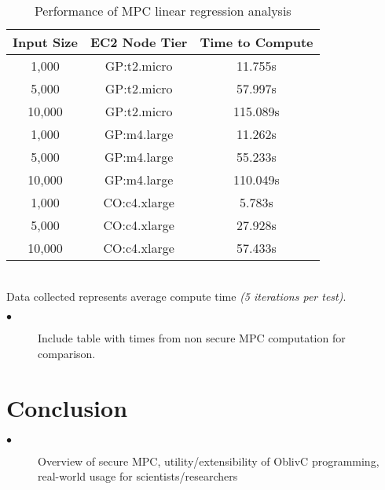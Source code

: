\documentclass{article}
\begin{document}
\begin{table}[htb]
\caption{Performance of MPC linear regression analysis}
\centering

\begin{tabular}{| c | c | c |}
\hline Input Size & EC2 Node Tier & Time to Compute\\
\hline 1,000 & GP:t2.micro & 11.755s\\
\hline 5,000 & GP:t2.micro & 57.997s\\
\hline 10,000 & GP:t2.micro & 115.089s\\ 
\hline 1,000 & GP:m4.large & 11.262s\\ 
\hline 5,000 & GP:m4.large & 55.233s\\ 
\hline 10,000 & GP:m4.large & 110.049s\\
\hline 1,000 & CO:c4.xlarge & 5.783s\\
\hline 5,000 & CO:c4.xlarge & 27.928s\\
\hline 10,000 & CO:c4.xlarge & 57.433s\\
\hline
\end{tabular}
\end{table}
\\Data collected represents average compute time \emph{(5 iterations per test)}. 
\begin{description}
\item[$\bullet$] Include table with times from non secure MPC computation for comparison.
\end{description}
\section{Conclusion}
\begin{description}
\item[$\bullet$] Overview of secure MPC, utility/extensibility of OblivC programming, real-world usage for scientists/researchers
\end{description}
\end{document}

